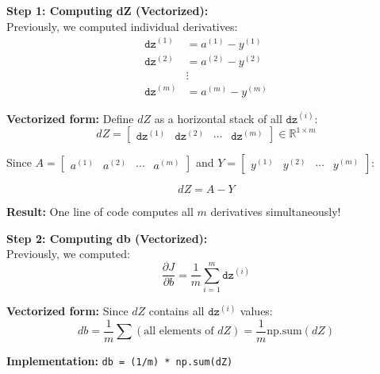 \documentclass[11pt,a4paper]{article}
\theoremstyle{definition}
\theoremstyle{remark}
\newcommand{\reals}{\mathbb{R}}
\begin{document}
\begin{gradcomp}
\textbf{Step 1: Computing dZ (Vectorized):} \\
Previously, we computed individual derivatives:
\begin{align}
\texttt{dz}^{(1)} &= a^{(1)} - y^{(1)} \\
\texttt{dz}^{(2)} &= a^{(2)} - y^{(2)} \\
&\vdots \\
\texttt{dz}^{(m)} &= a^{(m)} - y^{(m)}
\end{align}

\textbf{Vectorized form:} Define $dZ$ as a horizontal stack of all $\texttt{dz}^{(i)}$:
\[
dZ = \begin{bmatrix} \texttt{dz}^{(1)} & \texttt{dz}^{(2)} & \cdots & \texttt{dz}^{(m)} \end{bmatrix} \in \reals^{1 \times m}
\]

Since $A = \begin{bmatrix} a^{(1)} & a^{(2)} & \cdots & a^{(m)} \end{bmatrix}$ and $Y = \begin{bmatrix} y^{(1)} & y^{(2)} & \cdots & y^{(m)} \end{bmatrix}$:

\[
\boxed{dZ = A - Y}
\]

\textbf{Result:} One line of code computes all $m$ derivatives simultaneously!
\end{gradcomp}

\vspace{0.4cm}

\begin{gradcomp}
\textbf{Step 2: Computing db (Vectorized):} \\
Previously, we computed:
\[
\frac{\partial J}{\partial b} = \frac{1}{m} \sum_{i=1}^{m} \texttt{dz}^{(i)}
\]

\textbf{Vectorized form:} Since $dZ$ contains all $\texttt{dz}^{(i)}$ values:
\[
\boxed{db = \frac{1}{m} \sum(\text{all elements of } dZ) = \frac{1}{m} \text{np.sum}(dZ)}
\]

\textbf{Implementation:} \texttt{db = (1/m) * np.sum(dZ)}
\end{gradcomp}

\vspace{0.4cm}
\end{document}

